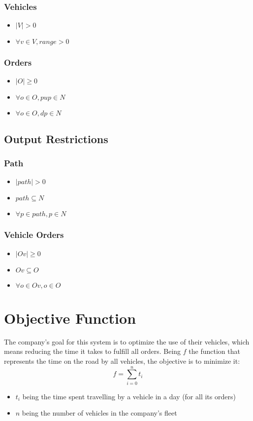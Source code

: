 \subsubsection{Vehicles}
\begin{itemize}
    \item $ |V| > 0 $
    \item $ \forall v \in V, range > 0 $
\end{itemize}

\subsubsection{Orders}
\begin{itemize}
    \item $ |O| \geq 0 $
    \item $ \forall o \in O, pup \in N $
    \item $ \forall o \in O, dp \in N $
\end{itemize}


\subsection{Output Restrictions}

\subsubsection{Path}
\begin{itemize}
    \item $ |path| > 0 $
    \item $ path \subseteq N $
    \item $ \forall p \in path, p \in N $
\end{itemize}

\subsubsection{Vehicle Orders}
\begin{itemize}
    \item $ |Ov| \geq 0 $
    \item $ Ov \subseteq O $
    \item $ \forall o \in Ov, o \in O$
\end{itemize}


\section{Objective Function}

The company's goal for this system is to optimize the use of their vehicles, which means reducing the time it takes to fulfill all orders. Being $ f $ the function that represents the time on the road by all vehicles, the objective is to minimize it:
\[ f = \sum_{i=0}^n t_i \]
\begin{itemize}
    \item $ t_i $ being the time spent travelling by a vehicle in a day (for all its orders)
    \item $ n $ being the number of vehicles in the company's fleet
\end{itemize}
